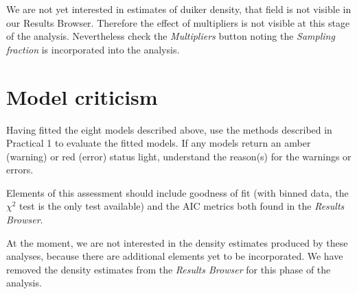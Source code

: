 \documentclass[a4paper, 10pt]{article}
\begin{document}
We are not yet interested in estimates of duiker density, that field is not visible in our Results Browser.  Therefore the effect of multipliers is not visible at this stage of the analysis.  Nevertheless check the \emph{Multipliers} button noting the \emph{Sampling fraction} is incorporated into the analysis.

\section{Model criticism}

Having fitted the eight models described above, use the methods described in Practical 1 to evaluate the fitted models. If any models return an amber (warning) or red (error) status light, understand the reason(s) for the warnings or errors. 

Elements of this assessment should include goodness of fit (with binned data, the $\chi^2$ test is the only test available) and the AIC metrics both found in the \emph{Results Browser}.  

At the moment, we are not interested in the density estimates produced by these analyses, because there are additional elements yet to be incorporated.  We have removed the density estimates from the \emph{Results Browser} for this phase of the analysis.

{
}
\end{document}
